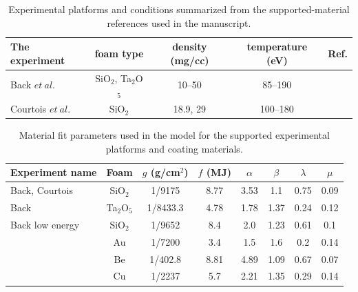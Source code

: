 \documentclass[11pt]{article}
\begin{document}
\begin{table}[!htbp]
\centering
\small
\renewcommand{\arraystretch}{1.1}
\begin{tabular}{lcccc}
\hline
The experiment & foam type & density (mg/cc) & temperature (eV) & Ref.\\
\hline
Back $et\ al.$ & SiO$_2$, Ta$_2$O$_5$ & 10--50 & 85--190 & ~\cite{Back2000PRL,Back2000POP}\\
Courtois $et\ al.$ & SiO$_2$ & 18.9, 29 & 100--180 & ~\cite{Courtois2024}\\
\hline
\end{tabular}
\caption{Experimental platforms and conditions summarized from the supported-material references used in the manuscript.}
\label{tab:supported_experiments}
\end{table}

\begin{table}[!htbp]
\centering
\small
\renewcommand{\arraystretch}{1.1}
\begin{tabular}{lccccccc}
\hline
Experiment name & Foam & $g$ (g/cm$^2$) & $f$ (MJ) & $\alpha$ & $\beta$ & $\lambda$ & $\mu$ \\
\hline
Back, Courtois & SiO$_2$ & 1/9175 & 8.77 & 3.53 & 1.1 & 0.75 & 0.09 \\
Back & Ta$_2$O$_5$ & 1/8433.3 & 4.78 & 1.78 & 1.37 & 0.24 & 0.12 \\
Back low energy & SiO$_2$ & 1/9652 & 8.4 & 2.0 & 1.23 & 0.61 & 0.1 \\
 & Au & 1/7200 & 3.4 & 1.5 & 1.6 & 0.2 & 0.14 \\
 & Be & 1/402.8 & 8.81 & 4.89 & 1.09 & 0.67 & 0.07 \\
 & Cu & 1/2237 & 5.7 & 2.21 & 1.35 & 0.29 & 0.14 \\
\hline
\end{tabular}
\caption{Material fit parameters used in the model for the supported experimental platforms and coating materials.}
\label{tab:material_fits}
\end{table}
\end{document}

